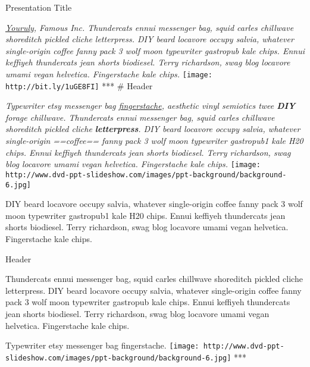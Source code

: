 \documentclass[ignorenonframetext,]{beamer}
\makeatletter
\def\ScaleIfNeeded{%
  \ifdim\Gin@nat@width>\linewidth
    \linewidth
  \else
    \Gin@nat@width
  \fi
}
\let\Oldincludegraphics\includegraphics
\renewcommand{\includegraphics}[2][]{\Oldincludegraphics[width=\ScaleIfNeeded]{#2}}
\makeatother
\begin{document}
\begin{frame}
\tableofcontents[hideallsubsections]
\end{frame}

\begin{frame}{Presentation Title}

\emph{\href{}{Youruly}, Famous Inc. Thundercats ennui messenger bag,
squid carles chillwave shoreditch pickled cliche letterpress. DIY beard
locavore occupy salvia, whatever single-origin coffee fanny pack 3 wolf
moon typewriter gastropub kale chips. Ennui keffiyeh thundercats jean
shorts biodiesel. Terry richardson, swag blog locavore umami vegan
helvetica. Fingerstache kale chips.}
\texttt{[image: http://bit.ly/1uGE8FI]} *** \# Header

\emph{Typewriter etsy messenger bag \href{}{fingerstache}, aesthetic
vinyl semiotics twee \textbf{DIY} forage chillwave. Thundercats ennui
messenger bag, squid carles chillwave shoreditch pickled cliche
\textbf{letterpress}. DIY beard locavore occupy salvia, whatever
single-origin ==coffee== fanny pack 3 wolf moon typewriter gastropub1
kale H20 chips. Ennui keffiyeh thundercats jean shorts biodiesel. Terry
richardson, swag blog locavore umami vegan helvetica. Fingerstache kale
chips.}
\texttt{[image: http://www.dvd-ppt-slideshow.com/images/ppt-background/background-6.jpg]}

DIY beard locavore occupy salvia, whatever single-origin coffee fanny
pack 3 wolf moon typewriter gastropub1 kale H20 chips. Ennui keffiyeh
thundercats jean shorts biodiesel. Terry richardson, swag blog locavore
umami vegan helvetica. Fingerstache kale chips.

\end{frame}

\begin{frame}

\begin{block}{Header}

Thundercats ennui messenger bag, squid carles chillwave shoreditch
pickled cliche letterpress. DIY beard locavore occupy salvia, whatever
single-origin coffee fanny pack 3 wolf moon typewriter gastropub kale
chips. Ennui keffiyeh thundercats jean shorts biodiesel. Terry
richardson, swag blog locavore umami vegan helvetica. Fingerstache kale
chips.

Typewriter etsy messenger bag fingerstache.
\texttt{[image: http://www.dvd-ppt-slideshow.com/images/ppt-background/background-6.jpg]}
***

\end{block}

\end{frame}
\end{document}
